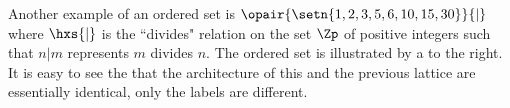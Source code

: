 \begin{itemize}
         \begin{minipage}{\tw-41mm-15mm}
           Another example of an ordered set is
           $\opair{\setn{1,2,3,5,6,10,15,30}}{|}$
           where $\hxs{|}$ is the ``divides" relation on the set $\Zp$ of positive integers such that
           $n|m$ represents $m$ divides $n$.
           The ordered set
           is illustrated by a  to the right.
           It is easy to see the that the architecture of this and the previous lattice are essentially identical,
           only the labels are different.
           \indxs{|}
         \end{minipage}%
         \begin{minipage}{41mm}%
         \begin{center}
         \end{center}
         \end{minipage}%


\end{itemize}
